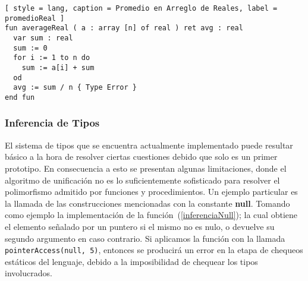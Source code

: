 \iffalse
Para flexibilizar el intérprete, podríamos implementar una \textit{coersión} implícita que convierta un número de tipo entero, a otro equivalente de tipo real, si fuese necesario.
De esta forma, obtendríamos la capacidad de emplear valores enteros en contextos donde se esperan números reales, como es el caso del ejemplo previo, donde deseamos dividir la sumatoria de valores en un arreglo de reales por su tamaño entero.
Otras situaciones que también se permitirían, comprenden la asignación de enteros a variables reales, o la llamada de funciones con parámetros del primer tipo cuando se esperaban del segundo.
Incluso podríamos ir un paso más adelante, y declarar a los números enteros como un \textit{subtipo} de los valores reales.
Esto implicaría una modificación estructural del actual sistema de tipos, donde deberíamos permitir situaciones más complejas que las contempladas anteriormente, como puede ser la de manipular un arreglo de enteros como si fuese un arreglo de reales.
La propiedad aún debe ser discutida y evaluada, ya que es necesario determinar su verdadera utilidad para el dictado de la materia.
\fi

\begin{lstlisting}[ style = lang, caption = Promedio en Arreglo de Reales, label = promedioReal ]
fun averageReal ( a : array [n] of real ) ret avg : real
  var sum : real
  sum := 0
  for i := 1 to n do
    sum := a[i] + sum
  od
  avg := sum / n { Type Error }
end fun
\end{lstlisting}

\subsubsection{Inferencia de Tipos}

El sistema de tipos que se encuentra actualmente implementado puede resultar básico a la hora de resolver ciertas cuestiones debido que solo es un primer prototipo.
En consecuencia a esto se presentan algunas limitaciones, donde el algoritmo de unificación no es lo suficientemente sofisticado para resolver el polimorfismo admitido por funciones y procedimientos.
Un ejemplo particular es la llamada de las construcciones mencionadas con la constante \textbf{null}.
Tomando como ejemplo la implementación de la función~(\ref{inferenciaNull}); la cual obtiene el elemento señalado por un puntero si el mismo no es nulo, o devuelve su segundo argumento en caso contrario.
Si aplicamos la función con la llamada \lstinline[style = lang]{pointerAccess(null, 5)}, entonces se producirá un error en la etapa de chequeos estáticos del lenguaje, debido a la imposibilidad de chequear los tipos involucrados.

